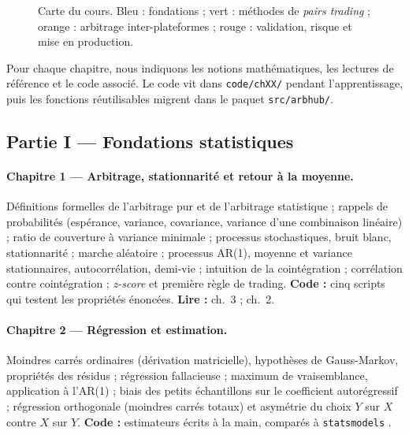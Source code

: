 \begin{figure}[h]
\caption{Carte du cours. Bleu : fondations ; vert : méthodes de \emph{pairs trading} ; orange : arbitrage inter-plateformes ; rouge : validation, risque et mise en production.}
\label{c0:fig:map}
\end{figure}

Pour chaque chapitre, nous indiquons les notions mathématiques, les lectures de référence et le code associé. Le code vit dans \texttt{code/chXX/} pendant l'apprentissage, puis les fonctions réutilisables migrent dans le paquet \texttt{src/arbhub/}.

\subsection{Partie I — Fondations statistiques}

\paragraph{Chapitre 1 — Arbitrage, stationnarité et retour à la moyenne.}
Définitions formelles de l'arbitrage pur et de l'arbitrage statistique \citep{hogan2004} ; rappels de probabilités (espérance, variance, covariance, variance d'une combinaison linéaire) ; ratio de couverture à variance minimale ; processus stochastiques, bruit blanc, stationnarité ; marche aléatoire ; processus AR(1), moyenne et variance stationnaires, autocorrélation, demi-vie ; intuition de la cointégration \citep{murray1994} ; corrélation contre cointégration ; \emph{z-score} et première règle de trading. \textbf{Code :} cinq scripts qui testent les propriétés énoncées. \textbf{Lire :} \citet{hamilton1994} ch.~3 ; \citet{chan2013} ch.~2.

\paragraph{Chapitre 2 — Régression et estimation.}
Moindres carrés ordinaires (dérivation matricielle), hypothèses de Gauss-Markov, propriétés des résidus ; régression fallacieuse \citep{granger1974} ; maximum de vraisemblance, application à l'AR(1) ; biais des petits échantillons sur le coefficient autorégressif ; régression orthogonale (moindres carrés totaux) et asymétrie du choix $Y$ sur $X$ contre $X$ sur $Y$. \textbf{Code :} estimateurs écrits à la main, comparés à \texttt{statsmodels} \citep{statsmodels}.


